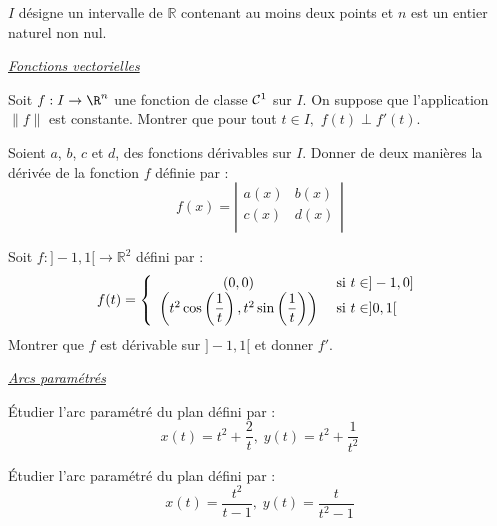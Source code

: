 \documentclass[a4paper,10pt]{report}
\begin{document}
\everymath{\displaystyle}


\begin{center}
\end{center}

\medskip

\noindent $I$ désigne un intervalle de $\mathbb{R}$ contenant au moins deux points et $n$ est un entier naturel non nul.

\medskip



\begin{center}
{\large \textit{\underline{Fonctions vectorielles}}}
\end{center}

\medskip

\exo Soit $f : I \rightarrow \R^n$ une fonction de classe ${\cal C}^1$ sur $I$.  On suppose que l'application $\|f\|$ est constante. Montrer que pour tout $t\in I,$ $f(t)\perp f'(t).$

\exo Soient $a$, $b$, $c$ et $d$, des fonctions dérivables sur $I$. Donner de deux manières la dérivée de la fonction $f$ définie par :
$$ f(x)  = \left\vert \begin{array}{cc}
a(x) 	& b(x) \\
c(x) & d(x) \\
\end{array}\right\vert$$

\exo Soit $f : ]-1,1[ \rightarrow \mathbb{R}^2$ défini par :
$$ f(t) = \left\lbrace \begin{array}{cl}
(0,0) & \hbox{ si } t \in ]-1,0] \\
\left( t^2  \cos \left( \dfrac{1}{t} \right), t^2  \sin \left( \dfrac{1}{t} \right) \right) & \hbox{ si } t \in ]0,1[ \\
\end{array}\right.$$
Montrer que $f$ est dérivable sur $]-1,1[$ et donner $f'$.



\begin{center}
{\large \textit{\underline{Arcs paramétrés}}}
\end{center}

\medskip

\exo Étudier l'arc paramétré du plan défini par :
$$ x(t) = t^2+ \dfrac{2}{t}, \; y(t) = t^2+\dfrac{1}{t^2} $$

\exo Étudier l'arc paramétré du plan défini par :
$$ x(t) = \dfrac{t^2}{t-1}, \; y(t) = \dfrac{t}{t^2-1} $$
\end{document}
